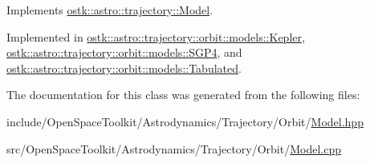 Implements \hyperlink{classostk_1_1astro_1_1trajectory_1_1_model_a4b2098483430a820481ed50b81656e31}{ostk\+::astro\+::trajectory\+::\+Model}.



Implemented in \hyperlink{classostk_1_1astro_1_1trajectory_1_1orbit_1_1models_1_1_kepler_a9c71803234f356ade03453e3ae19ae94}{ostk\+::astro\+::trajectory\+::orbit\+::models\+::\+Kepler}, \hyperlink{classostk_1_1astro_1_1trajectory_1_1orbit_1_1models_1_1_s_g_p4_a12416476201382c3d1e3c620f7be106a}{ostk\+::astro\+::trajectory\+::orbit\+::models\+::\+S\+G\+P4}, and \hyperlink{classostk_1_1astro_1_1trajectory_1_1orbit_1_1models_1_1_tabulated_a66be3f1f23a464c666c38a3adcc3bab5}{ostk\+::astro\+::trajectory\+::orbit\+::models\+::\+Tabulated}.



The documentation for this class was generated from the following files\+:\begin{DoxyCompactItemize}
\item 
include/\+Open\+Space\+Toolkit/\+Astrodynamics/\+Trajectory/\+Orbit/\hyperlink{_orbit_2_model_8hpp}{Model.\+hpp}\item 
src/\+Open\+Space\+Toolkit/\+Astrodynamics/\+Trajectory/\+Orbit/\hyperlink{_orbit_2_model_8cpp}{Model.\+cpp}\end{DoxyCompactItemize}
